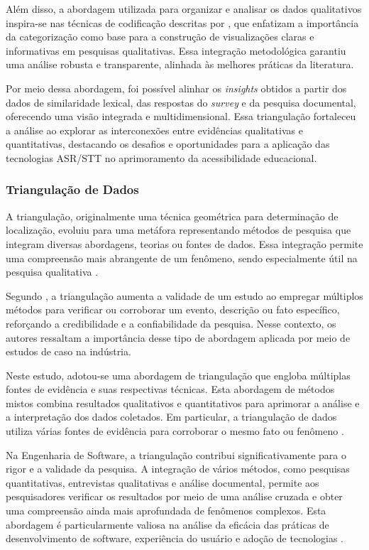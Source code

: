 Além disso, a abordagem utilizada para organizar e analisar os dados qualitativos inspira-se nas técnicas de codificação descritas por , que enfatizam a importância da categorização como base para a construção de visualizações claras e informativas em pesquisas qualitativas. Essa integração metodológica garantiu uma análise robusta e transparente, alinhada às melhores práticas da literatura.

Por meio dessa abordagem, foi possível alinhar os \textit{insights} obtidos a partir dos dados de similaridade lexical, das respostas do \textit{survey} e da pesquisa documental, oferecendo uma visão integrada e multidimensional. Essa triangulação fortaleceu a análise ao explorar as interconexões entre evidências qualitativas e quantitativas, destacando os desafios e oportunidades para a aplicação das tecnologias ASR/STT no aprimoramento da acessibilidade educacional.

\subsubsection{Triangulação de Dados}

A triangulação, originalmente uma técnica geométrica para determinação de localização, evoluiu para uma metáfora representando métodos de pesquisa que integram diversas abordagens, teorias ou fontes de dados. Essa integração permite uma compreensão mais abrangente de um fenômeno, sendo especialmente útil na pesquisa qualitativa \cite{Yin2015}. 

Segundo , a triangulação aumenta a validade de um estudo ao empregar múltiplos métodos para verificar ou corroborar um evento, descrição ou fato específico, reforçando a credibilidade e a confiabilidade da pesquisa. Nesse contexto, os autores ressaltam a importância desse tipo de abordagem aplicada por meio de estudos de caso na indústria.

Neste estudo, adotou-se uma abordagem de triangulação que engloba múltiplas fontes de evidência e suas respectivas técnicas. Esta abordagem de métodos mistos combina resultados qualitativos e quantitativos para aprimorar a análise e a interpretação dos dados coletados. Em particular, a triangulação de dados utiliza várias fontes de evidência para corroborar o mesmo fato ou fenômeno \cite{Yin2015}.

Na Engenharia de Software, a triangulação contribui significativamente para o rigor e a validade da pesquisa. A integração de vários métodos, como pesquisas quantitativas, entrevistas qualitativas e análise documental, permite aos pesquisadores verificar os resultados por meio de uma análise cruzada e obter uma compreensão ainda mais aprofundada de fenômenos complexos. Esta abordagem é particularmente valiosa na análise da eficácia das práticas de desenvolvimento de software, experiência do usuário e adoção de tecnologias \cite{Runeson2009}.

